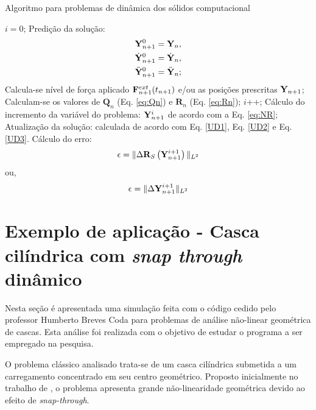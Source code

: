 \documentclass[tese_patricia]{subfiles}
\begin{document}
\begin{algorithm}
	\caption{Algoritmo para problemas de dinâmica dos sólidos computacional}
	\label{alg:solid_temporalIntegration}
	\begin{algorithmic}[1]
		\State $i=0$;
		\State Predição da solução: 
		\begin{align}
		\mathbf{Y}_{n+1}^{0} = \mathbf{Y}_{n},\\
		\dot{\mathbf{Y}}_{n+1}^{0} = \dot{\mathbf{Y}}_{n},\\
		\ddot{\mathbf{Y}}_{n+1}^{0} = \ddot{\mathbf{Y}}_{n};
		\end{align}
		\State Calcula-se  nível de força aplicado $\mathbf{F}^{ext}_{n+1}(t_{n+1})$ e/ou as posições prescritas $\mathbf{Y}_{n+1}$;
		\State Calculam-se os valores de $\mathbf{Q}_n$ (Eq. \eqref{eq:Qn}) e $\mathbf{R}_n$ (Eq. \eqref{eq:Rn});
		\State $i$++;
		\State Cálculo do incremento da variável do problema: $\mathbf{Y}_{n+1}^{i}$ de acordo com a Eq. \eqref{eq:NR};
		\State Atualização da solução: calculada de acordo com Eq. \eqref{UD1}, Eq. \eqref{UD2} e Eq. \eqref{UD3}.
		\State Cálculo do erro:
		\begin{align}
		\epsilon = \lVert \Delta\mathbf{R}_S\left(\mathbf{Y}_{n+1}^{i+1}\right) \lVert_{L^2} 
		\end{align}
		ou,
		\begin{align}
		\epsilon = \lVert\Delta\mathbf{Y}_{n+1}^{i+1}\lVert_{L^2} 
		\end{align}
		\EndWhile
		\EndFor
	\end{algorithmic}
\end{algorithm}

\section{Exemplo de aplicação - Casca cilíndrica com \textit{snap through} dinâmico}

Nesta seção é apresentada uma simulação feita com o código cedido pelo professor Humberto Breves Coda para problemas de análise não-linear geométrica de cascas. Esta análise foi realizada com o objetivo de estudar o programa a ser empregado na pesquisa.

O problema clássico analisado trata-se de um casca cilíndrica submetida a um carregamento concentrado em seu centro geométrico. Proposto inicialmente no trabalho de \cite{KuhlR:1999}, o problema apresenta grande não-linearidade geométrica devido ao efeito de \textit{snap-through}. 
\end{document}
